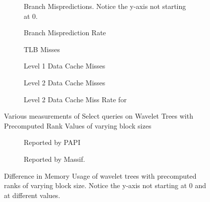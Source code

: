 \begin{figure}\tiny
\begin{subfigure}{0.48\textwidth}
	
	\caption{Branch Mispredictions. Notice the y-axis not starting at 0.}
	\label{fig:PrecomputedRankBlockSize_Select_BranchMiss}
\end{subfigure}
\hfill
\begin{subfigure}{0.48\textwidth}
	
	\caption{Branch Misprediction Rate}
	\label{fig:PrecomputedRankBlockSize_Select_BranchMissRate}
\end{subfigure}
\begin{subfigure}{0.48\textwidth}
	
	\caption{TLB Misses}
	\label{fig:PrecomputedRankBlockSize_Select_TLB}
\end{subfigure}
\hfill
\begin{subfigure}{0.48\textwidth}
	
	\caption{Level 1 Data Cache Misses}
	\label{fig:PrecomputedRankBlockSize_Select_L1CacheMiss}
\end{subfigure}
\begin{subfigure}{0.48\textwidth}
	
	\caption{Level 2 Data Cache Misses}
	\label{fig:PrecomputedRankBlockSize_Select_L2CacheMiss}
\end{subfigure}
\hfill
\begin{subfigure}{0.48\textwidth}
	
	\caption{Level 2 Data Cache Miss Rate for }
	\label{fig:PrecomputedRankBlockSize_Select_L2CacheMissRate}
\end{subfigure}
\caption{Various measurements of Select queries on Wavelet Trees with Precomputed Rank Values of varying block sizes}
\label{fig:PrecomputedRankBlockSize_Select}
%	
\end{figure}

\begin{figure}\tiny
	\begin{subfigure}{0.5\textwidth}
		
		\caption{Reported by PAPI}
		\label{fig:PrecomputedRankBlockSize_PAPI}
	\end{subfigure}
	\hfill
	\begin{subfigure}{0.5\textwidth}
		
		\caption{Reported by Massif.}
		\label{fig:PrecomputedRankBlockSize_Massif}
	\end{subfigure}
	\caption{Difference in Memory Usage of wavelet trees with precomputed ranks of varying block size. Notice the y-axis not starting at 0 and at different values.}
	\label{fig:PrecomputedRankBlockSize_Memory}
\end{figure}

